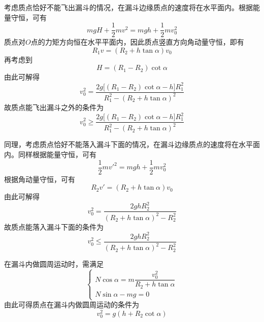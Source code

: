 \begin{solution}
考虑质点恰好不能飞出漏斗的情况，在漏斗边缘质点的速度将在水平面内。根据能量守恒，可有
\begin{equation*}
	mgH + \frac12 mv^2 = mgh + \frac12 mv_0^2
\end{equation*}
质点对$O$点的力矩方向恒在水平平面内，因此质点竖直方向角动量守恒，即有
\begin{equation*}
	R_1 v = (R_2+h \tan \alpha) v_0
\end{equation*}
再考虑到
\begin{equation*}
	H = (R_1 - R_2)\cot \alpha
\end{equation*}
由此可解得
\begin{equation*}
	v_0^2 = \frac{2g \big[(R_1-R_2)\cot \alpha - h\big]R_1^2}{R_1^2 - (R_2 + h\tan \alpha)^2}
\end{equation*}
故质点能飞出漏斗之外的条件为
\begin{equation*}
	v_0^2 \geqslant \frac{2g \big[(R_1-R_2)\cot \alpha - h\big]R_1^2}{R_1^2 - (R_2 + h\tan \alpha)^2}
\end{equation*}

同理，考虑质点恰好不能落入漏斗下面的情况，在漏斗边缘质点的速度将在水平面内。同样根据能量守恒，可有
\begin{equation*}
	\frac12 mv'^2 = mgh + \frac12 mv_0^2
\end{equation*}
根据角动量守恒，可有
\begin{equation*}
	R_2 v' = (R_2 + h\tan \alpha) v_0
\end{equation*}
由此可解得
\begin{equation*}
	v_0^2 = \frac{2ghR_2^2}{(R_2+h\tan \alpha)^2 - R_2^2}
\end{equation*}
故质点能落入漏斗下面的条件为
\begin{equation*}
	v_0^2 \leqslant \frac{2ghR_2^2}{(R_2+h\tan \alpha)^2 - R_2^2}
\end{equation*}

在漏斗内做圆周运动时，需满足
\begin{equation*}
\begin{cases}
	N\cos \alpha = m\dfrac{v_0^2}{R_2 + h\tan \alpha} \\[1.5ex]
	N\sin \alpha - mg = 0
\end{cases}
\end{equation*}
由此可得质点在漏斗内做圆周运动的条件为
\begin{equation*}
	v_0^2 = g(h+R_2 \cot \alpha)
\end{equation*}
\end{solution}

